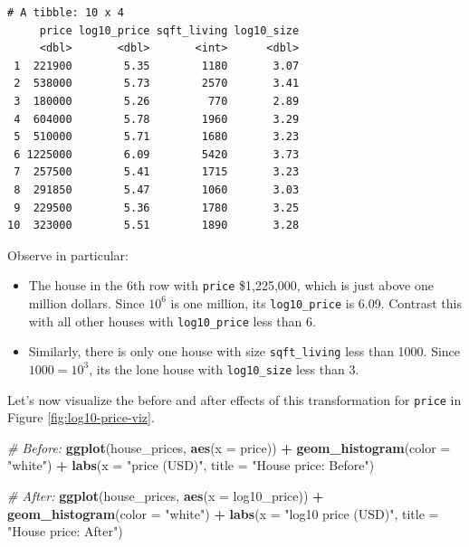 \documentclass[12pt,]{krantz}
\makeatletter
\newenvironment{Shaded}{\begin{snugshade}}{\end{snugshade}}
\newcommand{\KeywordTok}[1]{\textcolor[rgb]{0.27,0.27,0.27}{\textbf{#1}}}
\newcommand{\DataTypeTok}[1]{\textcolor[rgb]{0.27,0.27,0.27}{#1}}
\newcommand{\StringTok}[1]{\textcolor[rgb]{0.5,0.5,0.5}{#1}}
\newcommand{\CommentTok}[1]{\textcolor[rgb]{0.37,0.37,0.37}{\textit{#1}}}
\newcommand{\OperatorTok}[1]{\textcolor[rgb]{0.43,0.43,0.43}{\textbf{#1}}}
\newcommand{\NormalTok}[1]{#1}
\providecommand{\tightlist}{%
  \setlength{\itemsep}{0pt}\setlength{\parskip}{0pt}}
\newenvironment{kframe}{%
\medskip{}
\setlength{\fboxsep}{.8em}
 \def\at@end@of@kframe{}%
 \ifinner\ifhmode%
  \def\at@end@of@kframe{\end{minipage}}%
  \begin{minipage}{\columnwidth}%
 \fi\fi%
 \def\FrameCommand##1{\hskip\@totalleftmargin \hskip-\fboxsep
 \colorbox{shadecolor}{##1}\hskip-\fboxsep
     \hskip-\linewidth \hskip-\@totalleftmargin \hskip\columnwidth}%
 \MakeFramed {\advance\hsize-\width
   \@totalleftmargin\z@ \linewidth\hsize
   \@setminipage}}%
 {\par\unskip\endMakeFramed%
 \at@end@of@kframe}
\renewenvironment{Shaded}{\begin{kframe}}{\end{kframe}}
\theoremstyle{definition}
\theoremstyle{definition}
\theoremstyle{definition}
\theoremstyle{remark}
\makeatother
\begin{document}
\begin{verbatim}
# A tibble: 10 x 4
     price log10_price sqft_living log10_size
     <dbl>       <dbl>       <int>      <dbl>
 1  221900        5.35        1180       3.07
 2  538000        5.73        2570       3.41
 3  180000        5.26         770       2.89
 4  604000        5.78        1960       3.29
 5  510000        5.71        1680       3.23
 6 1225000        6.09        5420       3.73
 7  257500        5.41        1715       3.23
 8  291850        5.47        1060       3.03
 9  229500        5.36        1780       3.25
10  323000        5.51        1890       3.28
\end{verbatim}

Observe in particular:

\begin{itemize}
\tightlist
\item
  The house in the 6th row with \texttt{price} \$1,225,000, which is
  just above one million dollars. Since \(10^6\) is one million, its
  \texttt{log10\_price} is 6.09. Contrast this with all other houses
  with \texttt{log10\_price} less than 6.
\item
  Similarly, there is only one house with size \texttt{sqft\_living}
  less than 1000. Since \(1000 = 10^3\), its the lone house with
  \texttt{log10\_size} less than 3.
\end{itemize}

Let's now visualize the before and after effects of this transformation
for \texttt{price} in Figure \ref{fig:log10-price-viz}.

\begin{Shaded}
\begin{Highlighting}[]
\CommentTok{# Before:}
\KeywordTok{ggplot}\NormalTok{(house_prices, }\KeywordTok{aes}\NormalTok{(}\DataTypeTok{x =}\NormalTok{ price)) }\OperatorTok{+}
\StringTok{  }\KeywordTok{geom_histogram}\NormalTok{(}\DataTypeTok{color =} \StringTok{"white"}\NormalTok{) }\OperatorTok{+}
\StringTok{  }\KeywordTok{labs}\NormalTok{(}\DataTypeTok{x =} \StringTok{"price (USD)"}\NormalTok{, }\DataTypeTok{title =} \StringTok{"House price: Before"}\NormalTok{)}

\CommentTok{# After:}
\KeywordTok{ggplot}\NormalTok{(house_prices, }\KeywordTok{aes}\NormalTok{(}\DataTypeTok{x =}\NormalTok{ log10_price)) }\OperatorTok{+}
\StringTok{  }\KeywordTok{geom_histogram}\NormalTok{(}\DataTypeTok{color =} \StringTok{"white"}\NormalTok{) }\OperatorTok{+}
\StringTok{  }\KeywordTok{labs}\NormalTok{(}\DataTypeTok{x =} \StringTok{"log10 price (USD)"}\NormalTok{, }\DataTypeTok{title =} \StringTok{"House price: After"}\NormalTok{)}
\end{Highlighting}
\end{Shaded}
\end{document}
